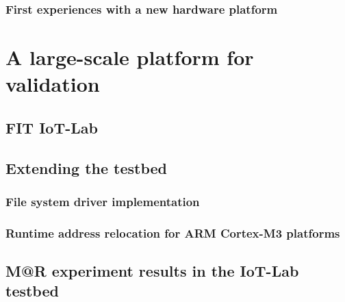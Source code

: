 \subsubsection{First experiences with a new hardware platform}


\section{A large-scale platform for validation}

\subsection{FIT IoT-Lab}

\subsection{Extending the testbed}

\subsubsection{File system driver implementation}

\subsubsection{Runtime address relocation for ARM Cortex-M3 platforms}

\subsection{M@R experiment results in the IoT-Lab testbed}